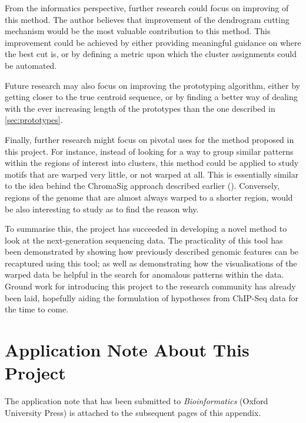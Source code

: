 \documentclass[parskip]{cs4rep}
\begin{document}
From the informatics perspective, further research could focus on improving of this method.
The author believes that improvement of the dendrogram cutting mechanism would be the most valuable contribution to this method. This improvement could be achieved by either providing meaningful guidance on where the best cut is, or by defining a metric upon which the cluster assignments could be automated.

Future research may also focus on improving the prototyping algorithm, either by getting closer to the true centroid sequence, or by finding a better way of dealing with the ever increasing length of the prototypes than the one described in \autoref{sec:prototypes}.

Finally, further research might focus on pivotal uses for the method proposed in this project.
For instance, instead of looking for a way to group similar patterns within the regions of interest into clusters, this method could be applied to study motifs that are warped very little, or not warped at all. This is essentially similar to the idea behind the ChromaSig approach described earlier (\cite{Hon:2008wv}). Conversely, regions of the genome that are almost always warped to a shorter region, would be also interesting to study as to find the reason why.

To summarise this, the project has succeeded in developing a novel method to look at the next-generation sequencing data. The practicality of this tool has been demonstrated by showing how previously described genomic features can be recaptured using this tool; as well as demonstrating how the visualisations of the warped data be helpful in the search for anomalous patterns within the data.
Ground work for introducing this project to the research community has already been laid, hopefully aiding the formulation of hypotheses from ChIP-Seq data for the time to come.




\appendix
\chapter{Application Note About This Project}
The application note that has been submitted to \emph{Bioinformatics} (Oxford University Press) is attached to the subsequent pages of this appendix.



\label{sec:supplementary-figures}
\end{document}
